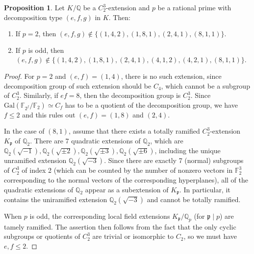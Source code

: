 \documentclass[letterpaper, 10pt]{article}
\newcommand{\Gal}{\mathrm{Gal}}
\newcommand{\bF}{\mathbb{F}}
\newcommand{\bQ}{\mathbb{Q}}
\newcommand{\frp}{\mathfrak{p}}
\newcommand{\1}{\mathds{1}}	%
\theoremstyle{definition}
\newtheorem{proposition}[theorem]{Proposition}
\theoremstyle{remark}
\begin{document}
\begin{proposition}
    \label{prop:C2C2C2ram}
    Let $K / \bQ$ be a $C_2^3$-extension and $p$ be a rational prime with decomposition type $(e, f, g)$ in $K$. Then:
    \begin{enumerate}
        \item If $p = 2$, then $(e, f, g) \not \in \{(1, 4, 2), (1, 8, 1), (2, 4, 1), (8, 1, 1)\}$.
        \item If $p$ is odd, then $(e, f, g) \not \in \{(1, 4, 2), (1, 8, 1), (2, 4, 1), (4, 1, 2), (4, 2, 1), (8, 1, 1)\}$.
    \end{enumerate}
\end{proposition}
\begin{proof}
 For $p = 2$ and $(e, f) = (1, 4)$, there is no such extension, since decomposition group of such extension should be $C_4$, which cannot be a subgroup of $C_2^3$.
Similarly, if $ef = 8$, then the decomposition group is $C_2^3$.
Since $\Gal(\bF_{2^f} / \bF_{2}) \simeq C_f$ has to be a quotient of the decomposition group, we have $f \le 2$ and this rules out $(e, f) = (1, 8)$ and $(2, 4)$.

In the case of $(8, 1)$, assume that there exists a totally ramified $C_2^3$-extension $K_\frp$ of $\bQ_2$.
There are 7 quadratic extensions of $\bQ_2$, which are $\bQ_2(\sqrt{-1}), \bQ_2(\sqrt{\pm 2}), \bQ_2(\sqrt{\pm 3}), \bQ_2(\sqrt{\pm 6})$, including the unique unramified extension $\bQ_2(\sqrt{-3})$.
Since there are exactly 7 (normal) subgroups of $C_2^3$ of index 2 (which can be counted by the number of nonzero vectors in $\bF_2^3$ corresponding to the normal vectors of the corresponding hyperplanes), all of the quadratic extensions of $\bQ_2$ appear as a subextension of $K_\frp$.
In particular, it contains the uniramified extension $\bQ_2(\sqrt{-3})$ and cannot be totally ramified.


When \( p \) is odd, the corresponding local field extensions \( K_\frp / \bQ_p \) (for \( \frp \mid p \)) are tamely ramified. The assertion then follows from the fact that the only cyclic subgroups or quotients of \( C_2^3 \) are trivial or isomorphic to \( C_2 \), so we must have \( e, f \le 2 \).
\end{proof}
\end{document}
